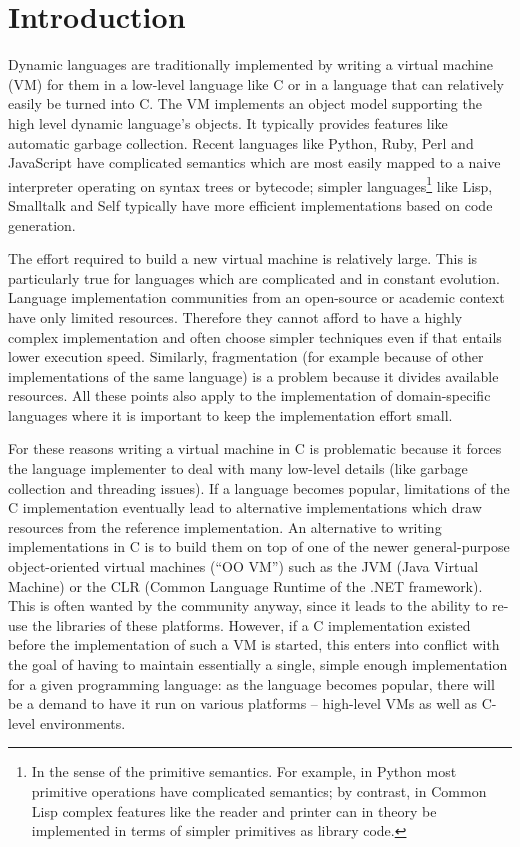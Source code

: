 \documentclass{llncs}
\begin{document}
\section{Introduction}

Dynamic languages are traditionally implemented by writing a virtual
machine (VM) for them in a low-level language like C or in a language that
can relatively easily be turned into C.  The VM implements an
object model supporting the high level dynamic language's objects.  It
typically provides features like automatic garbage collection.  Recent
languages like Python, Ruby, Perl and JavaScript have complicated
semantics which are most easily mapped to a naive interpreter operating
on syntax trees or bytecode; simpler languages\footnote
{
In the sense of the primitive semantics.  For example, in Python most
primitive operations have complicated semantics; by contrast, in Common
Lisp complex features like the reader and printer can in theory be
implemented in terms of simpler primitives as library code.
}
like Lisp, Smalltalk and Self typically have more
efficient implementations based on code generation.

The effort required to build a new virtual machine is relatively
large.  This is particularly true for languages which are complicated
and in constant evolution. Language implementation communities from an
open-source or academic context have only limited resources. Therefore they
cannot afford to have a highly complex implementation and often choose simpler
techniques even if that entails lower execution speed. Similarly, fragmentation
(for example because of other implementations of the same language) is a
problem because it divides available resources. All these points also apply to
the implementation of domain-specific languages where it is important to keep
the implementation effort small.

For these reasons writing a virtual machine in C is problematic because it
forces the language implementer to deal with many low-level details (like
garbage collection and threading issues). If a language becomes popular,
limitations of the C implementation eventually
lead to alternative implementations which draw
resources from the reference implementation. An alternative to writing
implementations in C is to build them on top of one of the newer
general-purpose object-oriented
virtual machines (``OO VM'') such as the JVM (Java Virtual Machine) or the
CLR (Common Language Runtime of the .NET framework). This is often wanted by
the community anyway, since it leads to the ability to re-use the libraries of
these platforms. However, if a C implementation existed before the
implementation of such a VM is started, this enters into conflict with the goal of
having to maintain essentially a single, simple enough implementation for a
given programming language: as the language becomes popular, there will be a
demand to have it run on various platforms -- high-level VMs as well as
C-level environments.
\end{document}
